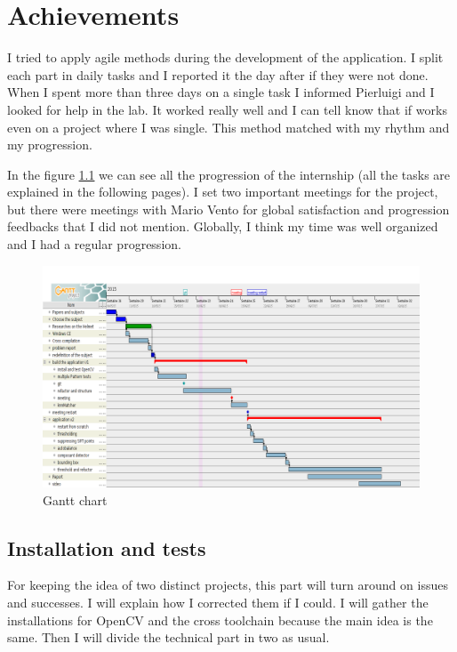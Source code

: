 \chapter{Achievements}
\par I tried to apply agile methods during the development of the application. I split each part in daily tasks and I reported it the day after if they were not done. When I spent more than three days on a single task I informed Pierluigi and I looked for help in the lab. It worked really well and I can tell know that if works even on a project where I was single. This method matched with my rhythm and my progression.
\par In the figure \ref{gantt} we can see all the progression of the internship (all the tasks are explained in the following pages). I set two important meetings for the project, but there were meetings with Mario Vento for global satisfaction and progression feedbacks that I did not mention. Globally, I think my time was well organized and I had a regular progression.

	\begin{figure}[h]
		\begin{center}
			\includegraphics[width=16cm]{images_not_compressed/gantt.png}
			\caption{Gantt chart}
			\label{gantt}	
		\end{center}
	\end{figure}
	
	
	\section{Installation and tests}
	

\par For keeping the idea of two distinct projects, this part will turn around on issues and successes. I will explain how I corrected them if I could. I will gather the installations for OpenCV and the cross toolchain because the main idea is the same. Then I will divide the technical part in two as usual.


